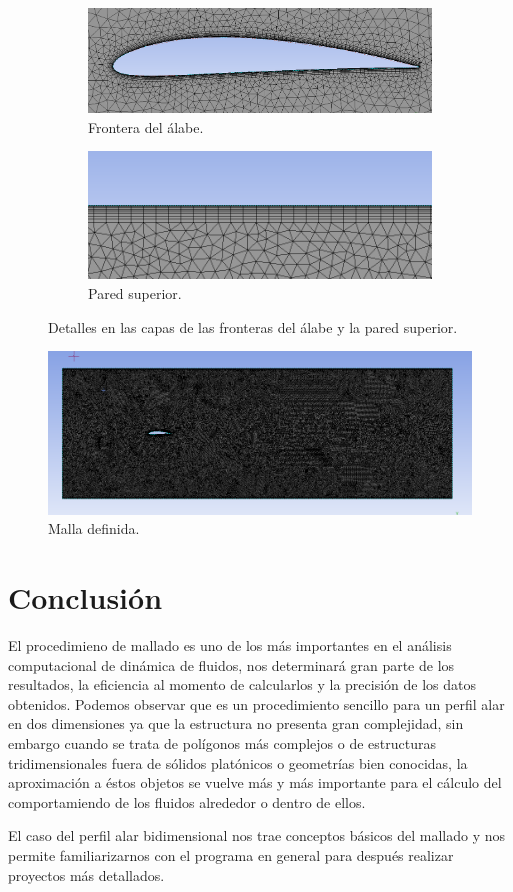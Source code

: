 \documentclass[12pt, letterpaper]{article}
\begin{document}
\begin{figure}[H]
	\centering
	\begin{subfigure}[b]{0.49\linewidth}
		\includegraphics[width=\linewidth]{18.png}
		\caption{Frontera del álabe.}
	\end{subfigure}
	\begin{subfigure}[b]{0.49\linewidth}
		\includegraphics[width=\linewidth]{19.png}
		\caption{Pared superior.}
	\end{subfigure}
	\caption{Detalles en las capas de las fronteras del álabe y la pared superior.}
\end{figure}

\begin{figure}[H]
	\centering
	\includegraphics[width=\textwidth]{17.png}
	\caption{Malla definida.}
\end{figure}

\section*{Conclusión}

El procedimieno de mallado es uno de los más importantes en el análisis computacional de dinámica de fluidos, nos determinará gran parte de los resultados, la eficiencia al momento de calcularlos y la precisión de los datos obtenidos. Podemos observar que es un procedimiento sencillo para un perfil alar en dos dimensiones ya que la estructura no presenta gran complejidad, sin embargo cuando se trata de polígonos más complejos o de estructuras tridimensionales fuera de sólidos platónicos o geometrías bien conocidas, la aproximación a éstos objetos se vuelve más y más importante para el cálculo del comportamiendo de los fluidos alrededor o dentro de ellos.

El caso del perfil alar bidimensional nos trae conceptos básicos del mallado y nos permite familiarizarnos con el programa en general para después realizar proyectos más detallados. 

\renewcommand\refname{References}
\printbibliography
\end{document}
